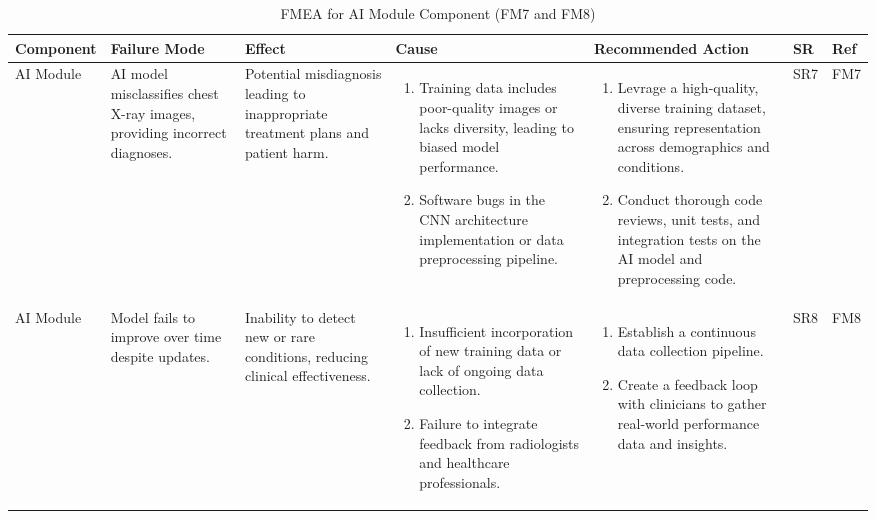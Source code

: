 \documentclass{article}
\begin{document}
\begin{landscape}
    \begin{table}[ht]
    \centering
    \caption{FMEA for AI Module Component (FM7 and FM8)}
    \renewcommand{\arraystretch}{1.1}
    {
    \setlength{\tabcolsep}{2pt}
    \begin{tabular}{|p{2.5cm}|p{2.5cm}|p{3cm}|p{5cm}|p{6cm}|p{1cm}|p{1cm}|}
    \hline
    \textbf{Component} & \textbf{Failure Mode} & \textbf{Effect} & \textbf{Cause} & \textbf{Recommended Action} & \textbf{SR} & \textbf{Ref} \\
    \hline

    AI Module
     & AI model misclassifies chest X-ray images, providing incorrect diagnoses.
     & Potential misdiagnosis leading to inappropriate treatment plans and patient harm.
     &
     \begin{enumerate}[leftmargin=*, label={\alph*.}, itemsep=1pt]
         \item Training data includes poor-quality images or lacks diversity, leading to biased model performance.
         \item Software bugs in the CNN architecture implementation or data preprocessing pipeline.
     \end{enumerate}
     &
     \begin{enumerate}[leftmargin=*, label={\alph*.}, itemsep=1pt]
         \item Levrage a high-quality, diverse training dataset, ensuring representation across demographics and conditions.
         \item Conduct thorough code reviews, unit tests, and integration tests on the AI model and preprocessing code.
     \end{enumerate}
     & SR7 & FM7 \\ \hline

    AI Module
     & Model fails to improve over time despite updates.
     & Inability to detect new or rare conditions, reducing clinical effectiveness.
     &
     \begin{enumerate}[leftmargin=*, label={\alph*.}, itemsep=1pt]
         \item Insufficient incorporation of new training data or lack of ongoing data collection.
         \item Failure to integrate feedback from radiologists and healthcare professionals.
     \end{enumerate}
     &
     \begin{enumerate}[leftmargin=*, label={\alph*.}, itemsep=1pt]
         \item Establish a continuous data collection pipeline.
         \item Create a feedback loop with clinicians to gather real-world performance data and insights.
     \end{enumerate}
     & SR8 & FM8 \\ \hline

    \end{tabular}
    }
    \end{table}
\end{landscape}
\end{document}
